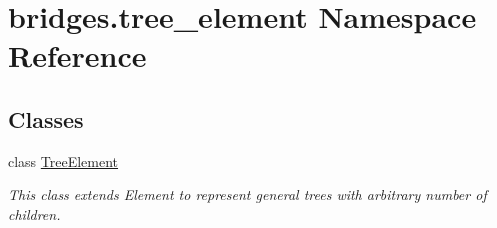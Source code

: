 \hypertarget{namespacebridges_1_1tree__element}{}\section{bridges.\+tree\+\_\+element Namespace Reference}
\label{namespacebridges_1_1tree__element}
\subsection*{Classes}
\begin{DoxyCompactItemize}
\item 
class \hyperlink{classbridges_1_1tree__element_1_1_tree_element}{Tree\+Element}
\begin{DoxyCompactList}\small\item\em This class extends Element to represent general trees with arbitrary number of children. \end{DoxyCompactList}\end{DoxyCompactItemize}

